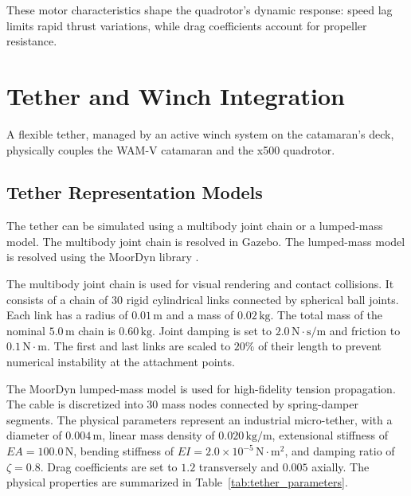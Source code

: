     These motor characteristics shape the quadrotor's dynamic response: speed lag limits rapid thrust variations, while drag coefficients account for propeller resistance.

\section{Tether and Winch Integration}
\label{sec:tether_coupling}

A flexible tether, managed by an active winch system on the catamaran's deck, physically couples the WAM-V catamaran and the x500 quadrotor.

    \subsection{Tether Representation Models}
    The tether can be simulated using a multibody joint chain or a lumped-mass model. The multibody joint chain is resolved in Gazebo. The lumped-mass model is resolved using the MoorDyn library \cite{hall2015moordyn}.
    
    The multibody joint chain is used for visual rendering and contact collisions. It consists of a chain of $30$ rigid cylindrical links connected by spherical ball joints. Each link has a radius of $0.01\,\text{m}$ and a mass of $0.02\,\text{kg}$. The total mass of the nominal $5.0\,\text{m}$ chain is $0.60\,\text{kg}$. Joint damping is set to $2.0\,\text{N}\cdot\text{s/m}$ and friction to $0.1\,\text{N}\cdot\text{m}$. The first and last links are scaled to $20\%$ of their length to prevent numerical instability at the attachment points.
    
    The MoorDyn lumped-mass model is used for high-fidelity tension propagation. The cable is discretized into $30$ mass nodes connected by spring-damper segments. The physical parameters represent an industrial micro-tether, with a diameter of $0.004\,\text{m}$, linear mass density of $0.020\,\text{kg/m}$, extensional stiffness of $EA = 100.0\,\text{N}$, bending stiffness of $EI = 2.0 \times 10^{-5}\,\text{N}\cdot\text{m}^2$, and damping ratio of $\zeta = 0.8$. Drag coefficients are set to $1.2$ transversely and $0.005$ axially. The physical properties are summarized in Table~\ref{tab:tether_parameters}.

